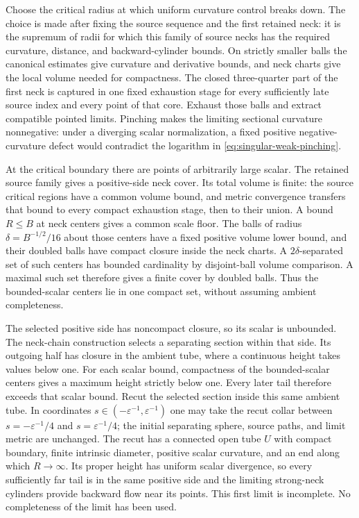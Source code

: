 Choose the critical radius at which uniform curvature control breaks down.
The choice is made after fixing the source sequence and the first retained
neck: it is the supremum of radii for which this family of source necks has
the required curvature, distance, and backward-cylinder bounds. On strictly
smaller balls the canonical estimates give curvature and derivative bounds,
and neck charts give the local volume needed for compactness. The closed
three-quarter part of the first neck is captured in one fixed exhaustion
stage for every sufficiently late source index and every point of that core.
Exhaust those balls and extract compatible
pointed limits. Pinching makes the limiting sectional curvature nonnegative:
under a diverging scalar normalization, a fixed positive negative-curvature
defect would contradict the logarithm in
\eqref{eq:singular-weak-pinching}.

At the critical boundary there are points of arbitrarily large scalar. The
retained source family gives a positive-side neck cover. Its total volume is
finite: the source critical regions have a common volume bound, and metric
convergence transfers that bound to every compact exhaustion stage, then to
their union. A bound $R\leq B$ at neck centers gives a common scale floor.
The balls of radius $\delta=B^{-1/2}/16$ about those centers have a fixed
positive volume lower bound, and their doubled balls have compact closure
inside the neck charts. A $2\delta$-separated set of such centers has
bounded cardinality by disjoint-ball volume comparison. A maximal such set
therefore gives a finite cover by doubled balls. Thus the bounded-scalar
centers lie in one compact set, without assuming ambient completeness.

The selected positive side has noncompact closure, so its scalar is
unbounded. The neck-chain construction selects a separating section within
that side. Its outgoing half has closure in the ambient tube, where a
continuous height takes values below one. For each scalar bound, compactness
of the bounded-scalar centers gives a maximum height strictly below one.
Every later tail therefore exceeds that scalar bound. Recut the selected
section inside this same ambient tube. In
coordinates $s\in(-\varepsilon^{-1},\varepsilon^{-1})$ one may take the
recut collar between $s=-\varepsilon^{-1}/4$ and
$s=\varepsilon^{-1}/4$; the initial separating sphere, source paths, and
limit metric are unchanged. The recut has a connected open tube $U$ with
compact boundary, finite intrinsic diameter, positive scalar curvature, and
an end along which $R\to\infty$. Its proper height has uniform scalar
divergence, so every sufficiently far tail is in the same positive side and
the limiting strong-neck cylinders provide backward flow near its points.
This first limit is incomplete. No completeness of the limit has been used.

